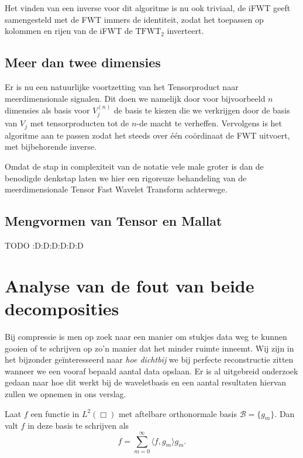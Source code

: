 Het vinden van een inverse voor dit algoritme is nu ook triviaal, de iFWT geeft samengesteld met de FWT
immers de identiteit, zodat het toepassen op kolommen en rijen van de iFWT de $\mathrm{TFWT}_2$ inverteert.

\subsection{Meer dan twee dimensies}
Er is nu een natuurlijke voortzetting van het Tensorproduct naar meerdimensionale signalen.
Dit doen we namelijk door voor bijvoorbeeld $n$ dimensies als basis voor $V^{(n)}_j$ de basis te kiezen die we verkrijgen 
door de basis van $V_j$ met tensorproducten tot de $n$-de macht te verheffen.
Vervolgens is het algoritme aan te passen zodat het steeds over \'e\'en co\"ordinaat de FWT uitvoert, 
met bijbehorende inverse.

Omdat de stap in complexiteit van de notatie vele male groter is dan de benodigde denkstap laten we hier een rigoreuze
behandeling van de meerdimensionale Tensor Fast Wavelet Transform achterwege.

\subsection{Mengvormen van Tensor en Mallat}

TODO :D:D:D:D:D:D

\section{Analyse van de fout van beide decomposities}

Bij compressie is men op zoek naar een manier om stukjes data weg te kunnen gooien of te schrijven op zo'n manier dat het minder ruimte inneemt. Wij zijn in het bijzonder ge\"interesseerd naar \emph{hoe dichtbij} we bij perfecte reconstructie zitten wanneer we een vooraf bepaald aantal data opslaan. Er is al uitgebreid onderzoek gedaan naar hoe dit werkt bij de waveletbasis en een aantal resultaten hiervan zullen we opnemen in ons verslag.

Laat $f$ een functie in $L^2(\Box)$ met aftelbare orthonormale basis $\mathcal{B} = \{ g_m \}$. Dan valt $f$ in deze basis te schrijven als
\[
f = \sum_{m = 0}^\infty \langle f, g_m \rangle g_m.
\]

